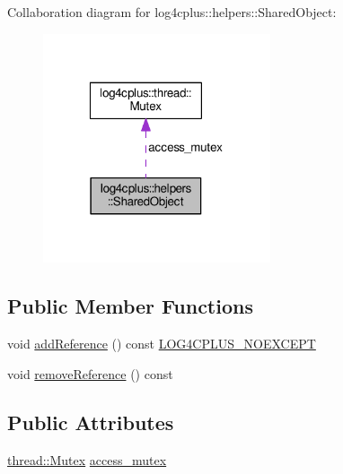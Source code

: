 Collaboration diagram for log4cplus\-:\-:helpers\-:\-:Shared\-Object\-:
\nopagebreak
\begin{figure}[H]
\begin{center}
\leavevmode
\includegraphics[width=190pt]{classlog4cplus_1_1helpers_1_1SharedObject__coll__graph}
\end{center}
\end{figure}
\subsection*{Public Member Functions}
\begin{DoxyCompactItemize}
\item 
void \hyperlink{classlog4cplus_1_1helpers_1_1SharedObject_a10acb07deda6f5d1a4615b72f1656658}{add\-Reference} () const \hyperlink{config_8hxx_a77d156ef570ca81fe10eb864ea349506}{L\-O\-G4\-C\-P\-L\-U\-S\-\_\-\-N\-O\-E\-X\-C\-E\-P\-T}
\item 
void \hyperlink{classlog4cplus_1_1helpers_1_1SharedObject_a1e1a82bd09ba33b72181dcb375f40b0d}{remove\-Reference} () const 
\end{DoxyCompactItemize}
\subsection*{Public Attributes}
\begin{DoxyCompactItemize}
\item 
\hyperlink{classlog4cplus_1_1thread_1_1Mutex}{thread\-::\-Mutex} \hyperlink{classlog4cplus_1_1helpers_1_1SharedObject_af7d354228772d3bb7daab8bd9cbfe934}{access\-\_\-mutex}
\end{DoxyCompactItemize}
